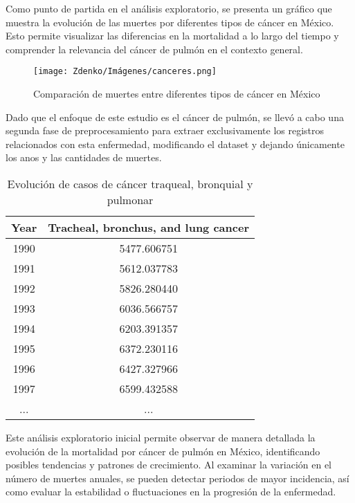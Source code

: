 Como punto de partida en el análisis exploratorio, se presenta un gráfico que muestra la evolución de las muertes por diferentes tipos de cáncer en México. Esto permite visualizar las diferencias en la mortalidad a lo largo del tiempo y comprender la relevancia del cáncer de pulmón en el contexto general.

\begin{figure}[h!] 
    \centering 
    \texttt{[image: Zdenko/Imágenes/canceres.png]}
    \caption{Comparación de muertes entre diferentes tipos de cáncer en México} 
    \label{fig:comparacion_canceres} 
\end{figure}


Dado que el enfoque de este estudio es el cáncer de pulmón, se llevó a cabo una segunda fase de preprocesamiento para extraer exclusivamente los registros relacionados con esta enfermedad, modificando el dataset y dejando únicamente los anos y las cantidades de muertes. 

\begin{table}[h!]
    \centering
    \begin{tabular}{|c|c|}
    \hline
    \textbf{Year} & \textbf{Tracheal, bronchus, and lung cancer} \\ \hline
    1990 & 5477.606751 \\ \hline
    1991 & 5612.037783 \\ \hline
    1992 & 5826.280440 \\ \hline
    1993 & 6036.566757 \\ \hline
    1994 & 6203.391357 \\ \hline
    1995 & 6372.230116 \\ \hline
    1996 & 6427.327966 \\ \hline
    1997 & 6599.432588 \\ \hline
    ... & ... \\ \hline
    \end{tabular}
    \caption{Evolución de casos de cáncer traqueal, bronquial y pulmonar}
    \label{table:lung_cancer}
\end{table}


Este análisis exploratorio inicial permite observar de manera detallada la evolución de la mortalidad por cáncer de pulmón en México, identificando posibles tendencias y patrones de crecimiento. Al examinar la variación en el número de muertes anuales, se pueden detectar periodos de mayor incidencia, así como evaluar la estabilidad o fluctuaciones en la progresión de la enfermedad.

